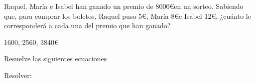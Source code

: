 \documentclass[addpoints,spanish, 12pt,a4paper]{exam}
\begin{document}
\begin{questions}
\question [2] Raquel, María e Isabel han ganado un premio de 8000\euro en un sorteo. Sabiendo que, para comprar los boletos, Raquel puso 5\euro, María 8\euro e Isabel 12\euro, ¿cuánto le corresponderá a cada una del premio que han ganado?
\begin{solution}
1600, 2560, 3840\euro
\end{solution}


\question Resuelve las siguientes ecuaciones

\question Resolver:
\end{questions}
\end{document}
